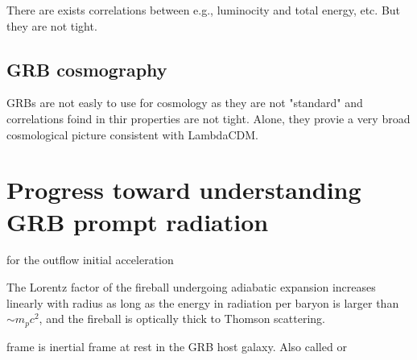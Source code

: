 There are exists correlations between e.g., luminocity and total energy, etc. But they are not tight.

\subsection{GRB cosmography}

GRBs are not easly to use for cosmology as they are not "standard" and correlations foind in thir properties are not tight. Alone, they provie a very broad cosmological picture consistent with LambdaCDM.


\section{Progress toward understanding GRB prompt radiation}

for the outflow initial acceleration 

The Lorentz factor of the fireball undergoing adiabatic expansion increases linearly with radius as long as the energy in radiation per baryon is larger than $\sim m_pc^2$, and the fireball is optically thick to Thomson scattering.

 frame is inertial frame at rest in the GRB host galaxy. Also called  or 